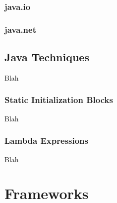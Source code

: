 \subsubsection{java.io}

\subsubsection{java.net}


\subsection{Java Techniques}

Blah

\subsubsection{Static Initialization Blocks}

Blah

\subsubsection{Lambda Expressions}


Blah \\


\toclineskip
\section{Frameworks}
